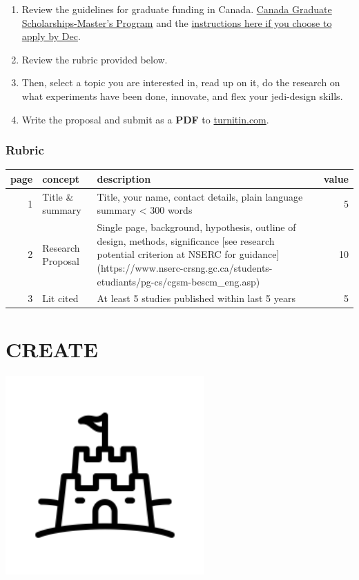 \documentclass[
]{book}
\begin{document}
\begin{enumerate}
\def\labelenumi{\arabic{enumi}.}
\item
  Review the guidelines for graduate funding in Canada. \href{http://www.nserc-crsng.gc.ca/students-etudiants/pg-cs/cgsm-bescm_eng.asp}{Canada Graduate Scholarships-Master's Program} and the \href{http://www.nserc-crsng.gc.ca/ResearchPortal-PortailDeRecherche/Instructions-Instructions/CGS_M-BESC_M_eng.asp}{instructions here if you choose to apply by Dec}.
\item
  Review the rubric provided below.
\item
  Then, select a topic you are interested in, read up on it, do the research on what experiments have been done, innovate, and flex your jedi-design skills.
\item
  Write the proposal and submit as a \textbf{PDF} to \href{http://www.turnitin.com}{turnitin.com}.
\end{enumerate}

\hypertarget{rubric-1}{%
\subsection*{Rubric}\label{rubric-1}}

\begin{tabular}{r|l|l|r}
\hline
page & concept & description & value\\
\hline
1 & Title \& summary & Title, your name, contact details, plain language summary < 300 words & 5\\
\hline
2 & Research Proposal & Single page, background, hypothesis, outline of design, methods, significance [see research potential criterion at NSERC for guidance](https://www.nserc-crsng.gc.ca/students-etudiants/pg-cs/cgsm-bescm\_eng.asp) & 10\\
\hline
3 & Lit cited & At least 5 studies published within last 5 years & 5\\
\hline
\end{tabular}

\hypertarget{create}{%
\chapter{CREATE}\label{create}}

\includegraphics[width=3in,height=\textheight]{./castle.png}
\end{document}
